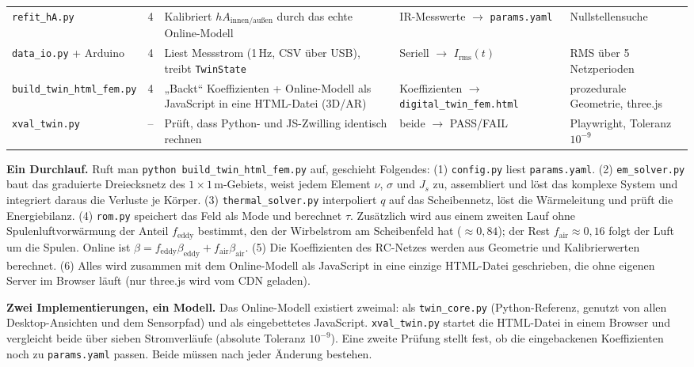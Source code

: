 \documentclass[a4paper, 10pt, conference]{ieeeconf}
\theoremstyle{remark}
\begin{document}
\begin{table}[t]
\begin{tabularx}{\textwidth}{@{}l c X X X@{}}
\texttt{refit\_hA.py} & 4 & Kalibriert $hA_{\mathrm{innen/außen}}$ durch das echte Online-Modell & IR-Messwerte $\to$ \texttt{params.yaml} & Nullstellensuche \\
\texttt{data\_io.py} + Arduino & 4 & Liest Messstrom (1\,Hz, CSV über USB), treibt \texttt{TwinState} & Seriell $\to$ $I_{\mathrm{rms}}(t)$ & RMS über 5 Netzperioden \\
\texttt{build\_twin\_html\_fem.py} & 4 & „Backt“ Koeffizienten + Online-Modell als JavaScript in eine HTML-Datei (3D/AR) & Koeffizienten $\to$ \texttt{digital\_twin\_fem.html} & prozedurale Geometrie, three.js \\
\texttt{xval\_twin.py} & -- & Prüft, dass Python- und JS-Zwilling identisch rechnen & beide $\to$ PASS/FAIL & Playwright, Toleranz $10^{-9}$ \\
\bottomrule
\end{tabularx}
\end{table}

\textbf{Ein Durchlauf.} Ruft man \texttt{python build\_twin\_html\_fem.py}
auf, geschieht Folgendes: (1) \texttt{config.py} liest
\texttt{params.yaml}. (2) \texttt{em\_solver.py} baut das graduierte
Dreiecksnetz des $1\times1\,$m-Gebiets, weist jedem Element $\nu$,
$\sigma$ und $J_s$ zu, assembliert und löst das komplexe System und
integriert daraus die Verluste je Körper. (3) \texttt{thermal\_solver.py}
interpoliert $q$ auf das Scheibennetz, löst die Wärmeleitung und prüft die
Energiebilanz. (4) \texttt{rom.py} speichert das Feld als Mode und
berechnet $\tau$. Zusätzlich wird aus einem zweiten Lauf ohne
Spulenluftvorwärmung der Anteil $f_{\mathrm{eddy}}$ bestimmt, den der
Wirbelstrom am Scheibenfeld hat ($\approx0{,}84$); der Rest
$f_{\mathrm{air}}\approx0{,}16$ folgt der Luft um die Spulen. Online ist
$\beta=f_{\mathrm{eddy}}\beta_{\mathrm{eddy}}+f_{\mathrm{air}}\beta_{\mathrm{air}}$.
(5) Die Koeffizienten des RC-Netzes werden aus Geometrie und
Kalibrierwerten berechnet. (6) Alles wird zusammen mit dem Online-Modell
als JavaScript in eine einzige HTML-Datei geschrieben, die ohne eigenen
Server im Browser läuft (nur three.js wird vom CDN geladen).

\textbf{Zwei Implementierungen, ein Modell.} Das Online-Modell existiert
zweimal: als \texttt{twin\_core.py} (Python-Referenz, genutzt von allen
Desktop-Ansichten und dem Sensorpfad) und als eingebettetes JavaScript.
\texttt{xval\_twin.py} startet die HTML-Datei in einem Browser und vergleicht
beide über sieben Stromverläufe (absolute Toleranz $10^{-9}$). Eine zweite
Prüfung stellt fest, ob die eingebackenen Koeffizienten noch zu
\texttt{params.yaml} passen. Beide müssen nach jeder Änderung bestehen.
\end{document}
